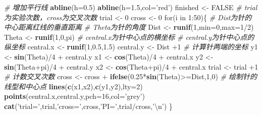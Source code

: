 \documentclass[]{article}
\newenvironment{Shaded}{\begin{snugshade}}{\end{snugshade}}
\newcommand{\KeywordTok}[1]{\textcolor[rgb]{0.13,0.29,0.53}{\textbf{{#1}}}}
\newcommand{\DataTypeTok}[1]{\textcolor[rgb]{0.13,0.29,0.53}{{#1}}}
\newcommand{\DecValTok}[1]{\textcolor[rgb]{0.00,0.00,0.81}{{#1}}}
\newcommand{\FloatTok}[1]{\textcolor[rgb]{0.00,0.00,0.81}{{#1}}}
\newcommand{\CharTok}[1]{\textcolor[rgb]{0.31,0.60,0.02}{{#1}}}
\newcommand{\StringTok}[1]{\textcolor[rgb]{0.31,0.60,0.02}{{#1}}}
\newcommand{\CommentTok}[1]{\textcolor[rgb]{0.56,0.35,0.01}{\textit{{#1}}}}
\newcommand{\OtherTok}[1]{\textcolor[rgb]{0.56,0.35,0.01}{{#1}}}
\newcommand{\NormalTok}[1]{{#1}}
\begin{document}
\begin{Shaded}
\begin{Highlighting}[]
\CommentTok{# 增加平行线}
\KeywordTok{abline}\NormalTok{(}\DataTypeTok{h=}\FloatTok{0.5}\NormalTok{)}
\KeywordTok{abline}\NormalTok{(}\DataTypeTok{h=}\FloatTok{1.5}\NormalTok{,}\DataTypeTok{col=}\StringTok{'red'}\NormalTok{)}
\NormalTok{finished <-}\StringTok{ }\OtherTok{FALSE}
\CommentTok{# trial为实验次数，cross为交叉次数}
\NormalTok{trial <-}\StringTok{ }\DecValTok{0}
\NormalTok{cross <-}\StringTok{ }\DecValTok{0}
\NormalTok{for(i in }\DecValTok{1}\NormalTok{:}\DecValTok{50}\NormalTok{)\{}
    \CommentTok{# Dist为针的中心距离红线的垂直距离}
    \CommentTok{# Theta为针的角度}
    \NormalTok{Dist <-}\StringTok{ }\KeywordTok{runif}\NormalTok{(}\DecValTok{1}\NormalTok{,}\DataTypeTok{min=}\DecValTok{0}\NormalTok{,}\DataTypeTok{max=}\DecValTok{1}\NormalTok{/}\DecValTok{2}\NormalTok{)}
    \NormalTok{Theta <-}\StringTok{ }\KeywordTok{runif}\NormalTok{(}\DecValTok{1}\NormalTok{,}\DecValTok{0}\NormalTok{,pi)}
    \CommentTok{# central.x为针中心点的横坐标}
    \CommentTok{# central.y为针中心点的纵坐标}
    \NormalTok{central.x <-}\StringTok{ }\KeywordTok{runif}\NormalTok{(}\DecValTok{1}\NormalTok{,}\FloatTok{0.5}\NormalTok{,}\FloatTok{1.5}\NormalTok{)}
    \NormalTok{central.y <-}\StringTok{ }\NormalTok{Dist +}\DecValTok{1}
    \CommentTok{# 计算针两端的坐标}
    \NormalTok{y1 <-}\StringTok{ }\KeywordTok{sin}\NormalTok{(Theta)/}\DecValTok{4} \NormalTok{+}\StringTok{ }\NormalTok{central.y}
    \NormalTok{x1 <-}\StringTok{ }\KeywordTok{cos}\NormalTok{(Theta)/}\DecValTok{4} \NormalTok{+}\StringTok{ }\NormalTok{central.x}
    \NormalTok{y2 <-}\StringTok{ }\KeywordTok{sin}\NormalTok{(Theta+pi)/}\DecValTok{4} \NormalTok{+}\StringTok{ }\NormalTok{central.y}
    \NormalTok{x2 <-}\StringTok{ }\KeywordTok{cos}\NormalTok{(Theta+pi)/}\DecValTok{4} \NormalTok{+}\StringTok{ }\NormalTok{central.x}
    \NormalTok{trial <-}\StringTok{ }\NormalTok{trial +}\DecValTok{1}
    \CommentTok{# 计数交叉次数}
    \NormalTok{cross <-}\StringTok{ }\NormalTok{cross +}\StringTok{ }\KeywordTok{ifelse}\NormalTok{(}\FloatTok{0.25}\NormalTok{*}\KeywordTok{sin}\NormalTok{(Theta)>=Dist,}\DecValTok{1}\NormalTok{,}\DecValTok{0}\NormalTok{)}
    \CommentTok{# 绘制针的线型和中心点}
    \KeywordTok{lines}\NormalTok{(}\KeywordTok{c}\NormalTok{(x1,x2),}\KeywordTok{c}\NormalTok{(y1,y2),}\DataTypeTok{lty=}\DecValTok{2}\NormalTok{)}
    \KeywordTok{points}\NormalTok{(central.x,central.y,}\DataTypeTok{pch=}\DecValTok{16}\NormalTok{,}\DataTypeTok{col=}\StringTok{'grey'}\NormalTok{)}
    \KeywordTok{cat}\NormalTok{(}\StringTok{'trial='}\NormalTok{,trial,}\StringTok{'cross='}\NormalTok{,cross,}\StringTok{'PI='}\NormalTok{,trial/cross,}\StringTok{'}\CharTok{\textbackslash{}n}\StringTok{'}\NormalTok{)}
\NormalTok{\}}
\end{Highlighting}
\end{Shaded}
\end{document}

